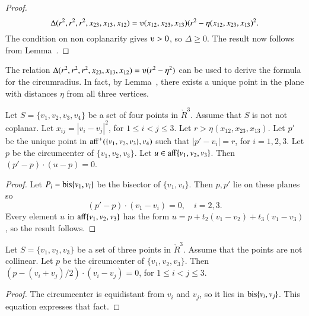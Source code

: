 \begin{proof}
$$\Delta(r^2,r^2,r^2,x_{23},x_{13},x_{12})=
   \ups(x_{12},x_{23},x_{13}) (r^2-\eta(x_{12},x_{23},x_{13})^2.$$
The condition on non coplanarity gives $\ups>0$, so
$\Delta\ge0$.  The result now follows from Lemma~. 
\end{proof}

\begin{remark} 
The relation 
$\Delta(r^2,r^2,r^2,x_{23},x_{13},x_{12})=\ups (r^2-\eta^2)$
can be used to derive the formula for the circumradius. In fact,
by Lemma~, there exists a unique point
in the plane with distances $\eta$ from all three vertices.
\end{remark}

\newpage

\begin{lemma}
Let $S=\{v_1,v_2,v_3,v_4\}$ be a set of four points
in $\ring{R}^3$.  Assume that $S$ is not not coplanar.
Let $x_{ij} = |v_i-v_j|^2$, for $1\le i < j\le 3$.
Let $r > \eta(x_{12},x_{23},x_{13})$.
Let $p'$ be the unique point in
${\operatorname{aff}}^+(\{v_1,v_2,v_3\},v_4)$
such that
   $|p'-v_i| = r$, for $i=1,2,3$.
Let $p$ be the circumcenter of $\{v_1,v_2,v_3\}$.  Let 
$u\in {\operatorname{aff}}\{v_1,v_2,v_3\}$.  Then
  $(p'-p)\cdot (u-p)=0$.
\end{lemma}

\begin{proof}  Let $P_i={\operatorname{bis}}\{v_1,v_i\}$ 
be the bisector
of $\{v_1,v_i\}$.  Then $p,p'$ lie on these planes so
  $$(p'-p)\cdot (v_1-v_i)=0,\quad i=2,3.$$
Every element $u$ in ${\operatorname{aff}}\{v_1,v_2,v_3\}$
has the form $u=p + t_2(v_1-v_2) + t_3(v_1-v_3)$, so the result
follows.
\end{proof}

\newpage

\begin{lemma}
Let $S=\{v_1,v_2,v_3\}$ be a set of three points
in $\ring{R}^3$.  Assume that the points are not collinear.
Let $p$ be the circumcenter of $\{v_1,v_2,v_3\}$.   Then
  $(p-(v_i+v_j)/2)\cdot (v_i-v_j)=0$, for $1\le i<j\le 3$.
\end{lemma}

\begin{proof}  The circumcenter is equidistant from $v_i$
and $v_j$, so it lies in ${\operatorname{bis}}\{v_i,v_j\}$.
This equation expresses that fact.
\end{proof}


